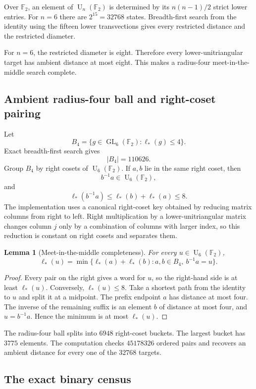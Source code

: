 \documentclass[11pt]{amsart}
\numberwithin{equation}{section}
\newtheorem{lemma}[theorem]{Lemma}
\theoremstyle{definition}
\theoremstyle{remark}
\newcommand{\F}{\mathbb F}
\newcommand{\GL}{\operatorname{GL}}
\newcommand{\U}{\operatorname{U}}
\newcommand{\ellAll}{\ell_{*}}
\begin{document}
Over $\F_2$, an element of $\U_n(\F_2)$ is determined by its $n(n-1)/2$ strict lower entries.  For $n=6$ there are $2^{15}=32768$ states.  Breadth-first search from the identity using the fifteen lower transvections gives every restricted distance and the restricted diameter.

For $n=6$, the restricted diameter is eight.  Therefore every lower-unitriangular target has ambient distance at most eight.  This makes a radius-four meet-in-the-middle search complete.

\subsection{Ambient radius-four ball and right-coset pairing}

Let
\[
B_4=\{g\in\GL_6(\F_2):\ellAll(g)\le4\}.
\]
Exact breadth-first search gives
\[
|B_4|=110626.
\]
Group $B_4$ by right cosets of $\U_6(\F_2)$.  If $a,b$ lie in the same right coset, then
\[
b^{-1}a\in\U_6(\F_2),
\]
and
\[
\ellAll(b^{-1}a)\le\ellAll(b)+\ellAll(a)\le8.
\]
The implementation uses a canonical right-coset key obtained by reducing matrix columns from right to left.  Right multiplication by a lower-unitriangular matrix changes column $j$ only by a combination of columns with larger index, so this reduction is constant on right cosets and separates them.

\begin{lemma}[Meet-in-the-middle completeness]\label{lem:mitm-complete}
For every $u\in\U_6(\F_2)$,
\[
\ellAll(u)
=
\min\{\ellAll(a)+\ellAll(b):a,b\in B_4,\ b^{-1}a=u\}.
\]
\end{lemma}

\begin{proof}
Every pair on the right gives a word for $u$, so the right-hand side is at least $\ellAll(u)$.  Conversely, $\ellAll(u)\le8$.  Take a shortest path from the identity to $u$ and split it at a midpoint.  The prefix endpoint $a$ has distance at most four.  The inverse of the remaining suffix is an element $b$ of distance at most four, and $u=b^{-1}a$.  Hence the minimum is at most $\ellAll(u)$.
\end{proof}

The radius-four ball splits into $6948$ right-coset buckets.  The largest bucket has $3775$ elements.  The computation checks $45178326$ ordered pairs and recovers an ambient distance for every one of the $32768$ targets.

\subsection{The exact binary census}
\end{document}
